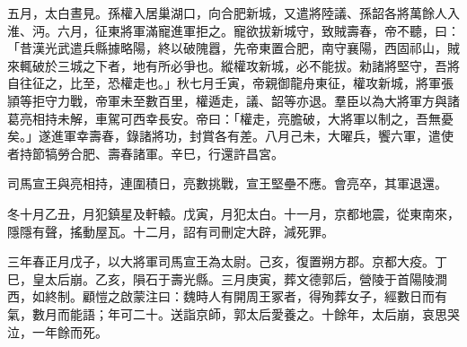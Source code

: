 \begin{pinyinscope}
五月，太白晝見。孫權入居巢湖口，向合肥新城，又遣將陸議、孫韶各將萬餘人入淮、沔。六月，征東將軍滿寵進軍拒之。寵欲拔新城守，致賊壽春，帝不聽，曰：「昔漢光武遣兵縣據略陽，終以破隗囂，先帝東置合肥，南守襄陽，西固祁山，賊來輒破於三城之下者，地有所必爭也。縱權攻新城，必不能拔。勑諸將堅守，吾將自往征之，比至，恐權走也。」秋七月壬寅，帝親御龍舟東征，權攻新城，將軍張頴等拒守力戰，帝軍未至數百里，權遁走，議、韶等亦退。羣臣以為大將軍方與諸葛亮相持未解，車駕可西幸長安。帝曰：「權走，亮膽破，大將軍以制之，吾無憂矣。」遂進軍幸壽春，錄諸將功，封賞各有差。八月己未，大曜兵，饗六軍，遣使者持節犒勞合肥、壽春諸軍。辛巳，行還許昌宮。

司馬宣王與亮相持，連圍積日，亮數挑戰，宣王堅壘不應。會亮卒，其軍退還。

冬十月乙丑，月犯鎮星及軒轅。戊寅，月犯太白。十一月，京都地震，從東南來，隱隱有聲，搖動屋瓦。十二月，詔有司刪定大辟，減死罪。

三年春正月戊子，以大將軍司馬宣王為太尉。己亥，復置朔方郡。京都大疫。丁巳，皇太后崩。乙亥，隕石于壽光縣。三月庚寅，葬文德郭后，營陵于首陽陵澗西，如終制。顧愷之啟蒙注曰：魏時人有開周王冢者，得殉葬女子，經數日而有氣，數月而能語；年可二十。送詣京師，郭太后愛養之。十餘年，太后崩，哀思哭泣，一年餘而死。


\end{pinyinscope}
